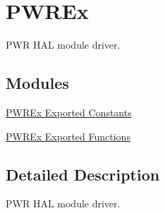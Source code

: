 \hypertarget{group___p_w_r_ex}{\section{P\-W\-R\-Ex}
\label{group___p_w_r_ex}
}


P\-W\-R H\-A\-L module driver.  


\subsection*{Modules}
\begin{DoxyCompactItemize}
\item 
\hyperlink{group___p_w_r_ex___exported___constants}{P\-W\-R\-Ex Exported Constants}
\item 
\hyperlink{group___p_w_r_ex___exported___functions}{P\-W\-R\-Ex Exported Functions}
\end{DoxyCompactItemize}


\subsection{Detailed Description}
P\-W\-R H\-A\-L module driver. 